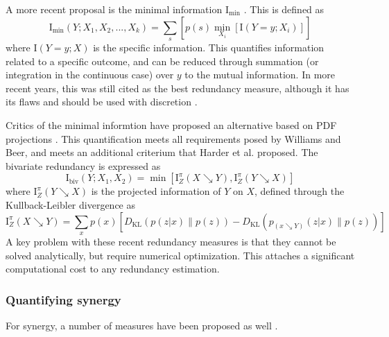 \documentclass[../main.tex]{subfiles}
\begin{document}
A more recent proposal is the minimal information $\mathrm{I}_\mathrm{min}$ \cite{williams2010nonnegative}.
This is defined as
%
\begin{equation}
\mathrm{I}_\mathrm{min}(Y;{X_1, X_2,...,X_k}) = \sum_s [p(s) \min_{X_i} [\mathrm{I}(Y=y;X_i)]]
\end{equation}
%
where $\mathrm{I}(Y = y;X)$ is the specific information.
This quantifies information related to a specific outcome, and can be reduced through summation (or integration in the continuous case) over $y$ to the mutual information.
In more recent years, this was still cited as the best redundancy measure, although it has its flaws and should be used with discretion \cite{lizier2013towards, olbrich2015information}.

Critics of the minimal informtion have proposed an alternative based on PDF projections \cite{harder2013bivariate}.
This quantification meets all requirements posed by Williams and Beer, and meets an additional criterium that Harder et al. proposed.
The bivariate redundancy is expressed as
%
\begin{equation}
\mathrm{I}_\mathrm{biv}(Y;{X_1, X_2}) = \min [\mathrm{I}_Z^\pi (X \searrow Y), \mathrm{I}_Z^\pi (Y \searrow X)] 
\end{equation}
%
where $\mathrm{I}_Z^\pi (Y \searrow X)$ is the projected information of $Y$ on $X$, defined through the Kullback-Leibler divergence as
%
\begin{equation}
\mathrm{I}_Z^\pi (X \searrow Y) = \sum_x p(x) [D_\mathrm{KL} (p(z|x) \| p(z)) - D_\mathrm{KL} (p_{(x \searrow Y)}(z|x) \| p(z))]
\end{equation}
A key problem with these recent redundancy measures is that they cannot be solved analytically, but require numerical optimization.
This attaches a significant computational cost to any redundancy estimation.

\subsubsection{Quantifying synergy}

For synergy, a number of measures have been proposed as well \cite{griffith2014quantifying, olbrich2015information}.

\end{document}
